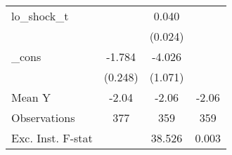 {\begin{tabular}{l*{3}{c}}
\addlinespace
lo\_shock\_t  &                     &       0.040         &                     \\
            &                     &     (0.024)         &                     \\
\addlinespace
\_cons      &      -1.784\sym{***}&      -4.026\sym{***}&                     \\
            &     (0.248)         &     (1.071)         &                     \\
\midrule
Mean Y      &       -2.04         &       -2.06         &       -2.06         \\
Observations&         377         &         359         &         359         \\
Exc. Inst. F-stat&                     &      38.526         &       0.003         \\
\bottomrule
\end{tabular}
}
